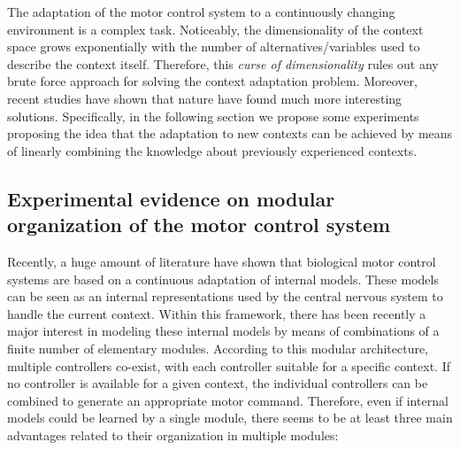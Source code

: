 \documentclass{svmult}
\begin{document}
The adaptation of the motor control system to a continuously 
changing environment is a complex task. Noticeably, the dimensionality
of the context space grows exponentially with the number 
of alternatives/variables used to describe the context itself.
Therefore, this {\em curse of dimensionality} rules out any 
brute force approach for solving the context adaptation problem.
Moreover, recent studies have shown that nature have 
found much more interesting solutions. Specifically, in the 
following section we propose some experiments proposing the idea 
that the adaptation to new contexts can be achieved by means of 
linearly combining the knowledge about previously experienced contexts.

\subsection{Experimental evidence on modular organization of the motor control system}
\label{Sec:ExpEvid}

Recently, a huge amount of literature have shown that 
biological motor control systems are based on a continuous
adaptation of internal models. These models can be seen as
an internal representations used by the central nervous system
to handle the current context. Within this framework, there has been recently a major interest 
in modeling these internal models by means of combinations of a finite 
number of elementary modules. According to this modular architecture, 
multiple controllers co-exist, with each controller suitable for a 
specific context. If no controller is available for a given 
context, the individual controllers can be combined to generate 
an appropriate motor command. Therefore, even if internal models could be
learned by a single module, there seems to be at least three main
advantages \cite{WolpertKawato1998} related to their organization 
in multiple modules:
\end{document}
